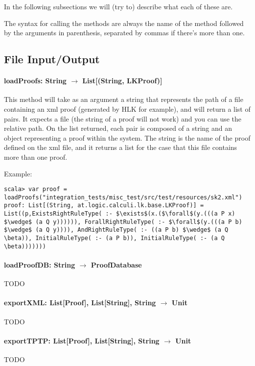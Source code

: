 \documentclass[a4paper, 11pt]{report}
\begin{document}
In the following subsections we will (try to) describe what each of these are.

The syntax for calling the methods are always the name of the method followed by
the arguments in parenthesis, separated by commas if there's more than one.

\subsection{File Input/Output}

\paragraph{\textbf{loadProofs: String $\rightarrow$ List[(String, LKProof)]}}
This method will take as an argument a string that represents the path of a file
containing an xml proof (generated by HLK for example), and will return a list 
of pairs. It expects a file (the string of a proof will not work) and you can use 
the relative path. On the list returned, each pair is composed of a string and 
an object representing a proof within the system. The string is the name of the 
proof defined on the xml file, and it returns a list for the case that this file
contains more than one proof.

Example:
\begin{lstlisting}[mathescape]
scala> var proof = loadProofs("integration_tests/misc_test/src/test/resources/sk2.xml")
proof: List[(String, at.logic.calculi.lk.base.LKProof)] = List((p,ExistsRightRuleType( :- $\exists$(x.($\forall$(y.(((a P x) $\wedge$ (a Q y)))))), ForallRightRuleType( :- $\forall$(y.(((a P b) $\wedge$ (a Q y)))), AndRightRuleType( :- ((a P b) $\wedge$ (a Q \beta)), InitialRuleType( :- (a P b)), InitialRuleType( :- (a Q \beta)))))))
\end{lstlisting}

\paragraph{\textbf{loadProofDB: String $\rightarrow$ ProofDatabase}}
{\color{red}TODO}

\paragraph{\textbf{exportXML: List[Proof], List[String], String $\rightarrow$ Unit}}
{\color{red}TODO}

\paragraph{\textbf{exportTPTP: List[Proof], List[String], String $\rightarrow$ Unit}}
{\color{red}TODO}
\end{document}
